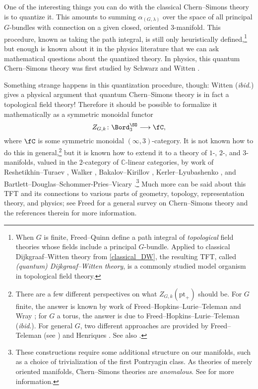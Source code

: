\begin{remark}
\label{quantum_CS}
One of the interesting things you can do with the classical Chern--Simons theory is to quantize it. This amounts to
summing $\alpha_{(G, \lambda)}$ over the space of all principal $G$-bundles with connection on a given closed,
oriented $3$-manifold. This procedure, known as taking the path integral, is still only heuristically
defined,\footnote{When $G$ is finite, Freed--Quinn \cite{FQ93} define a path integral of \emph{topological} field
theories whose fields include a principal $G$-bundle. Applied to classical Dijkgraaf--Witten theory from
\cref{classical_DW}, the resulting TFT, called \textit{(quantum) Dijkgraaf--Witten theory}, is a commonly studied
model organism in topological field theory.} but enough is known about it in the physics literature that we can ask
mathematical questions about the quantized theory. In physics, this quantum Chern--Simons theory was first studied
by Schwarz \cite{Sch77} and Witten \cite{Wit89}.%
%
%

Something strange happens in this quantization procedure, though: Witten (\textit{ibid.}) gives a physical argument
that quantum Chern--Simons theory is in fact a topological field theory! Therefore it should be possible to
formalize it mathematically as a symmetric monoidal functor 
\begin{equation}
	Z_{G,k}\colon\Bord_3^{\SO}\longrightarrow \fC,
\end{equation}
where $\fC$ is some symmetric monoidal $(\infty, 3)$-category. It is not known how to do this in
general,\footnote{There are a few different perspectives on what $Z_{G,k}(\mathrm{pt}_+)$ should be. For $G$
finite, the answer is known by work of Freed--Hopkins--Lurie--Teleman \cite[\S 4.2]{FHLT10} and Wray \cite[\S
9]{Wra10}; for $G$ a torus, the answer is due to Freed--Hopkins--Lurie--Teleman (\textit{ibid}.). For general $G$,
two different approaches are provided by Freed--Teleman (see \cite{432876}) and Henriques \cite{Hen17b, Hen17a}.
See also \cite{FT20}.}
but it is known how to extend it to a theory of $1$-, $2$-, and $3$-manifolds, valued in the $2$-category of
$\mathbb C$-linear categories, by work of Reshetikhin--Turaev \cite{RT90, RT91}, Walker \cite{Wal91},
Bakalov--Kirillov \cite{BK01}, Kerler--Lyubashenko \cite{KL01}, and
Bartlett--Douglas--Schommer-Pries--Vicary \cite{BDSV15}.\footnote{These constructions require some additional
structure on our manifolds, such as a choice of trivialization of the first Pontryagin class. As theories of merely
oriented manifolds, Chern--Simons theories are \emph{anomalous}. See \cites[\S 9.3]{FHLT10}[]{432876} for more
information.} Much more can be said about this TFT and its connections to various parts of
geometry, topology, representation theory, and physics; see Freed \cite{Fre09} for a
general survey on Chern--Simons theory and the references therein for more information.
\end{remark}

